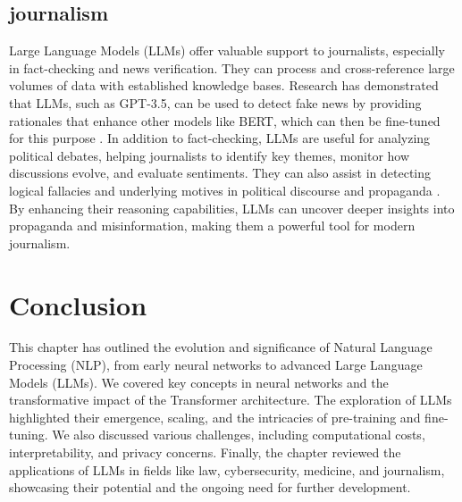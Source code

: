 \subsection{journalism}
Large Language Models (LLMs) offer valuable support to journalists, especially in fact-checking and news verification. They can process and cross-reference large volumes of data with established knowledge bases. Research has demonstrated that LLMs, such as GPT-3.5, can be used to detect fake news by providing rationales that enhance other models like BERT, which can then be fine-tuned for this purpose .
In addition to fact-checking, LLMs are useful for analyzing political debates, helping journalists to identify key themes, monitor how discussions evolve, and evaluate sentiments. They can also assist in detecting logical fallacies and underlying motives in political discourse and propaganda . By enhancing their reasoning capabilities, LLMs can uncover deeper insights into propaganda and misinformation, making them a powerful tool for modern journalism\cite{helwe2024}.

\section{Conclusion}
This chapter has outlined the evolution and significance of Natural Language Processing (NLP), from early neural networks to advanced Large Language Models (LLMs). We covered key concepts in neural networks and the transformative impact of the Transformer architecture. The exploration of LLMs highlighted their emergence, scaling, and the intricacies of pre-training and fine-tuning. We also discussed various challenges, including computational costs, interpretability, and privacy concerns. Finally, the chapter reviewed the applications of LLMs in fields like law, cybersecurity, medicine, and journalism, showcasing their potential and the ongoing need for further development.